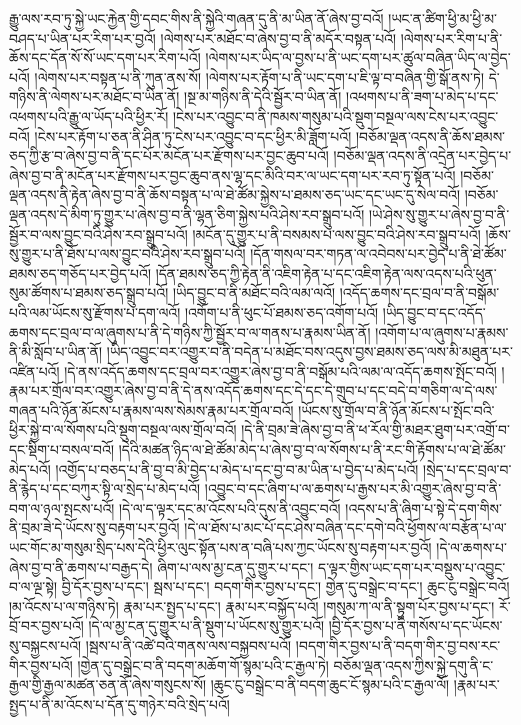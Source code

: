 རྒྱུ་ལས་རབ་ཏུ་སྐྱེ་ཡང་རྐྱེན་གྱི་དབང་གིས་ནི་སྐྱེའི་གཞན་དུ་ནི་མ་ཡིན་ནོ་ཞེས་བྱ་བའོ། །ཡང་ན་ཚིག་ཕྱི་མ་ཕྱི་མ་བཤད་པ་ཡིན་པར་རིག་པར་བྱའོ། །ལེགས་པར་མཐོང་བ་ཞེས་བྱ་བ་ནི་མདོར་བསྟན་པའོ། །ལེགས་པར་རིག་པ་ནི་ཆོས་དང་དོན་སོ་སོ་ཡང་དག་པར་རིག་པའོ། །ལེགས་པར་ཡིད་ལ་བྱས་པ་ནི་ཡང་དག་པར་ཚུལ་བཞིན་ཡིད་ལ་བྱེད་པའོ། །ལེགས་པར་བསྟན་པ་ནི་ཀུན་ནས་སོ། །ལེགས་པར་རྟོག་པ་ནི་ཡང་དག་པ་ཇི་ལྟ་བ་བཞིན་གྱི་སྒོ་ནས་ཏེ། དེ་གཉིས་ནི་ལེགས་པར་མཐོང་བ་ཡིན་ནོ། །སྔ་མ་གཉིས་ནི་དེའི་སྦྱོར་བ་ཡིན་ནོ། །འཕགས་པ་ནི་ཟག་པ་མེད་པ་དང་འཕགས་པའི་རྒྱུ་ལ་ཡོད་པའི་ཕྱིར་རོ། །ངེས་པར་འབྱུང་བ་ནི་ཁམས་གསུམ་པའི་སྡུག་བསྔལ་ལས་ངེས་པར་འབྱུང་བའོ། །ངེས་པར་རྟོག་པ་ཅན་ནི་ཤིན་ཏུ་ངེས་པར་འབྱུང་བ་དང་ཕྱིར་མི་ཟློག་པའོ། །བཅོམ་ལྡན་འདས་ནི་ཆོས་ཐམས་ཅད་ཀྱི་རྩ་བ་ཞེས་བྱ་བ་ནི་དང་པོར་མངོན་པར་རྫོགས་པར་བྱང་ཆུབ་པའོ། །བཅོམ་ལྡན་འདས་ནི་འདྲེན་པར་བྱེད་པ་ཞེས་བྱ་བ་ནི་མངོན་པར་རྫོགས་པར་བྱང་ཆུབ་ནས་ལྷ་དང་མིའི་བར་ལ་ཡང་དག་པར་རབ་ཏུ་སྟོན་པའོ། །བཅོམ་ལྡན་འདས་ནི་རྟེན་ཞེས་བྱ་བ་ནི་ཆོས་བསྟན་པ་ལ་ཐེ་ཚོམ་སྐྱེས་པ་ཐམས་ཅད་ཡང་དང་ཡང་དུ་སེལ་བའོ། །བཅོམ་ལྡན་འདས་དེ་མིག་ཏུ་གྱུར་པ་ཞེས་བྱ་བ་ནི་ལྷན་ཅིག་སྐྱེས་པའི་ཤེས་རབ་སྒྲུབ་པའོ། །ཡེ་ཤེས་སུ་གྱུར་པ་ཞེས་བྱ་བ་ནི་སྦྱོར་བ་ལས་བྱུང་བའི་ཤེས་རབ་སྒྲུབ་པའོ། །མངོན་དུ་གྱུར་པ་ནི་བསམས་པ་ལས་བྱུང་བའི་ཤེས་རབ་སྒྲུབ་པའོ། །ཆོས་སུ་གྱུར་པ་ནི་ཐོས་པ་ལས་བྱུང་བའི་ཤེས་རབ་སྒྲུབ་པའོ། །དོན་གསལ་བར་གཏན་ལ་འབེབས་པར་བྱེད་པ་ནི་ཐེ་ཚོམ་ཐམས་ཅད་གཅོད་པར་བྱེད་པའོ། །དོན་ཐམས་ཅད་ཀྱི་རྟེན་ནི་འཇིག་རྟེན་པ་དང་འཇིག་རྟེན་ལས་འདས་པའི་ཕུན་སུམ་ཚོགས་པ་ཐམས་ཅད་སྒྲུབ་པའོ། །ཡིད་བྱུང་བ་ནི་མཐོང་བའི་ལམ་ལའོ། །འདོད་ཆགས་དང་བྲལ་བ་ནི་བསྒོམ་པའི་ལམ་ཡོངས་སུ་རྫོགས་པ་དག་ལའོ། །འགོག་པ་ནི་ཕུང་པོ་ཐམས་ཅད་འགོག་པའོ། །ཡིད་བྱུང་བ་དང་འདོད་ཆགས་དང་བྲལ་བ་ལ་ཞུགས་པ་ནི་དེ་གཉིས་ཀྱི་སྦྱོར་བ་ལ་གནས་པ་རྣམས་ཡིན་ནོ། །འགོག་པ་ལ་ཞུགས་པ་རྣམས་ནི་མི་སློབ་པ་ཡིན་ནོ། །ཡིད་འབྱུང་བར་འགྱུར་བ་ནི་བདེན་པ་མཐོང་བས་འདུས་བྱས་ཐམས་ཅད་ལས་མི་མཐུན་པར་འཛིན་པའོ། །དེ་ནས་འདོད་ཆགས་དང་བྲལ་བར་འགྱུར་ཞེས་བྱ་བ་ནི་བསྒོམ་པའི་ལམ་ལ་འདོད་ཆགས་སྤོང་བའོ། །རྣམ་པར་གྲོལ་བར་འགྱུར་ཞེས་བྱ་བ་ནི་དེ་ནས་འདོད་ཆགས་དང་དེ་དང་དེ་གྲུབ་པ་དང་བདེ་བ་གཅིག་ལ་དེ་ལས་གཞན་པའི་ཉོན་མོངས་པ་རྣམས་ལས་སེམས་རྣམ་པར་གྲོལ་བའོ། །ཡོངས་སུ་གྲོལ་བ་ནི་ཉོན་མོངས་པ་སྤོང་བའི་ཕྱིར་སྐྱེ་བ་ལ་སོགས་པའི་སྡུག་བསྔལ་ལས་གྲོལ་བའོ། །དེ་ནི་བྲམ་ཟེ་ཞེས་བྱ་བ་ནི་ཕ་རོལ་གྱི་མཐར་ཐུག་པར་འགྲོ་བ་དང་སྡིག་པ་བསལ་བའོ། །དེའི་མཚན་ཉིད་ལ་ཐེ་ཚོམ་མེད་པ་ཞེས་བྱ་བ་ལ་སོགས་པ་ནི་རང་གི་རྟོགས་པ་ལ་ཐེ་ཚོམ་མེད་པའོ། །འགྱོད་པ་བཅད་པ་ནི་བྱ་བ་མི་བྱེད་པ་མེད་པ་དང་བྱ་བ་མ་ཡིན་པ་བྱེད་པ་མེད་པའོ། །སྲེད་པ་དང་བྲལ་བ་ནི་རྙེད་པ་དང་བཀུར་སྟི་ལ་སྲེད་པ་མེད་པའོ། །འབྱུང་བ་དང་ཞིག་པ་ལ་ཆགས་པ་རྒྱས་པར་མི་འགྱུར་ཞེས་བྱ་བ་ནི་བག་ལ་ཉལ་སྤངས་པའོ། །དེ་ལ་ད་ལྟར་དང་མ་འོངས་པའི་དུས་ནི་འབྱུང་བའོ། །འདས་པ་ནི་ཞིག་པ་སྟེ་དེ་དག་གིས་ནི་བྲམ་ཟེ་དེ་ཡོངས་སུ་བརྟག་པར་བྱའོ། །དེ་ལ་ཐོས་པ་མང་པོ་དང་ཤེས་བཞིན་དང་དགེ་བའི་ཕྱོགས་ལ་བརྩོན་པ་ལ་ཡང་གོང་མ་གསུམ་སྲིད་པས་དེའི་ཕྱིར་ལུང་སྟོན་པས་ན་བཞི་པས་ཀྱང་ཡོངས་སུ་བརྟག་པར་བྱའོ། །དེ་ལ་ཆགས་པ་ཞེས་བྱ་བ་ནི་ཆགས་པ་བརྒྱད་དེ། ཞིག་པ་ལས་མྱ་ངན་དུ་གྱུར་པ་དང་། ད་ལྟར་གྱིས་ཡང་དག་པར་བསྡུས་པ་འབྱུང་བ་ལ་ལྔ་སྟེ། བྱི་དོར་བྱས་པ་དང་། སྦས་པ་དང་། བདག་གིར་བྱས་པ་དང་། གྱེན་དུ་བསྒྲེང་བ་དང་། ཆུང་ངུ་བསྒྲེང་བའོ། །མ་འོངས་པ་ལ་གཉིས་ཏེ། རྣམ་པར་སྤྱད་པ་དང་། རྣམ་པར་བསྐྱོད་པའོ། །གསུམ་ཀ་ལ་ནི་སྟུག་པོར་བྱས་པ་དང་། རོ་བྲོ་བར་བྱས་པའོ། །དེ་ལ་མྱ་ངན་དུ་གྱུར་པ་ནི་སྡུག་པ་ཡོངས་སུ་གྱུར་པའོ། །བྱི་དོར་བྱས་པ་ནི་གསོས་པ་དང་ཡོངས་སུ་བསྐྱངས་པའོ། །སྦས་པ་ནི་འཚེ་བའི་གནས་ལས་བསྐྱབས་པའོ། །བདག་གིར་བྱས་པ་ནི་བདག་གིར་བྱ་བས་རང་གིར་བྱས་པའོ། །གྱེན་དུ་བསྒྲེང་བ་ནི་བདག་མཆོག་གོ་སྙམ་པའི་ང་རྒྱལ་ཏེ། བཅོམ་ལྡན་འདས་ཀྱིས་སྐྱེ་དགུ་ནི་ང་རྒྱལ་གྱི་རྒྱལ་མཚན་ཅན་ནོ་ཞེས་གསུངས་སོ། །ཆུང་ངུ་བསྒྲེང་བ་ནི་བདག་ཆུང་ངོ་སྙམ་པའི་ང་རྒྱལ་ལོ། །རྣམ་པར་སྤྱད་པ་ནི་མ་འོངས་པ་དོན་དུ་གཉེར་བའི་སྲེད་པའོ། 